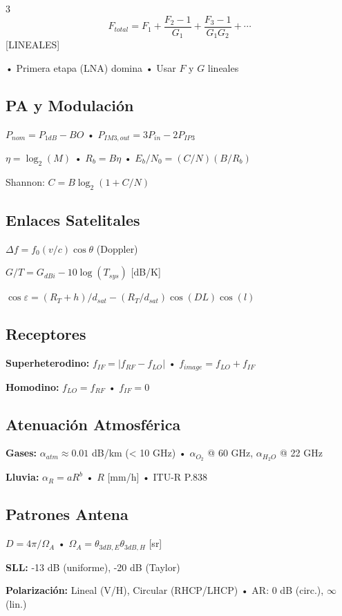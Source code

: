 \documentclass[a4paper,6pt]{extarticle}
\begin{document}
\begin{multicols}{3}
$$\boxed{F_{total} = F_1 + \frac{F_2-1}{G_1} + \frac{F_3-1}{G_1G_2} + \cdots}$$ [LINEALES]

• Primera etapa (LNA) domina • Usar $F$ y $G$ lineales

    \subsection*{PA y Modulación}
    $P_{nom} = P_{1dB} - BO$ • $P_{IM3,out} = 3P_{in} - 2P_{IP3}$
    
    $\boxed{\eta = \log_2(M)}$ • $R_b = B\eta$ • $E_b/N_0 = (C/N)(B/R_b)$
    
    Shannon: $\boxed{C = B\log_2(1 + C/N)}$

    \subsection*{Enlaces Satelitales}
    $\boxed{\Delta f = f_0(v/c)\cos\theta}$ (Doppler)
    
    $\boxed{G/T = G_{dBi} - 10\log(T_{sys})}$ [dB/K]
    
    $\cos\varepsilon = (R_T + h)/d_{sat} - (R_T/d_{sat})\cos(DL)\cos(l)$

    \subsection*{Receptores}
    \textbf{Superheterodino:} $f_{IF} = |f_{RF} - f_{LO}|$ • $f_{image} = f_{LO} + f_{IF}$
    
    \textbf{Homodino:} $f_{LO} = f_{RF}$ • $f_{IF} = 0$

    \subsection*{Atenuación Atmosférica}
    \textbf{Gases:} $\alpha_{atm} \approx 0.01$ dB/km (< 10 GHz) • $\alpha_{O_2}$ @ 60 GHz, $\alpha_{H_2O}$ @ 22 GHz
    
    \textbf{Lluvia:} $\boxed{\alpha_R = a R^b}$ • $R$ [mm/h] • ITU-R P.838

    \subsection*{Patrones Antena}
    $D = 4\pi/\Omega_A$ • $\Omega_A = \theta_{3dB,E} \theta_{3dB,H}$ [sr]
    
    \textbf{SLL:} -13 dB (uniforme), -20 dB (Taylor)
    
    \textbf{Polarización:} Lineal (V/H), Circular (RHCP/LHCP) • AR: 0 dB (circ.), $\infty$ (lin.)


\end{multicols}
\end{document}
